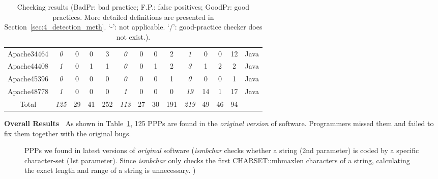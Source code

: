 \begin{table}[tb!]
\begin{adjustwidth}{-.75in}{-.75in}
{\begin{tabular}{cccccccccccccc}
Apache34464    & {\it  0}     & 0      & 0      & 3      & {\it 0 }     & 0      & 0      & 2      & {\it 1  }    & 0      & 0      & 12     & Java	\\
Apache44408    & {\it  1}     & 0      & 1      & 1      & {\it 0 }     & 0      & 1      & 2      & {\it 3  }    & 1      & 2      & 2      & Java	\\
Apache45396    & {\it  0}     & 0      & 0      & 0      & {\it 0 }     & 0      & 0      & 1      & {\it 0  }    & 0      & 0      & 1      & Java	\\
Apache48778    & {\it  1}     & 0      & 0      & 0      & {\it 1 }     & 0      & 0      & 0      & {\it 19 }    & 14     & 1      & 17     & Java	\\
\midrule                                                                                                                              
Total          & {\it 125}    & 29     & 41     & 252    & {\it 113}    & 27     & 30     & 191    & {\it 219}    & 49     & 46     & 94     &    	\\
\bottomrule
\end{tabular}
}
\end{adjustwidth}
\caption{Checking results
(BadPr: bad practice; F.P.: false positives; GoodPr: good practices. More detailed definitions are presented in
Section~\ref{sec:4_detection_meth}. `-': not applicable. `/': good-practice checker does not exist.).}
\label{tab:4_detect_result}
\end{table}

{\bf Overall Results\ }
As shown in Table~\ref{tab:4_detect_result}, 125 PPPs are found in the {\it original 
version} of software.
Programmers missed them and failed to fix them together with the original bugs.



\begin{figure}
  \centering
  \hfill
  \framebox{}
  \hfill
  \framebox{}
  \hspace*{\fill}
  \caption{PPPs we found in latest versions of {\it original} software (\textit{ismbchar} checks whether a string (2nd parameter) 
   is coded by a specific character-set (1st parameter). 
   Since \textit{ismbchar} only checks the first CHARSET::mbmaxlen characters of a string, 
   calculating the exact length and range of a string is unnecessary. )}
  \label{fig:MySQL15811&New}
\end{figure}


